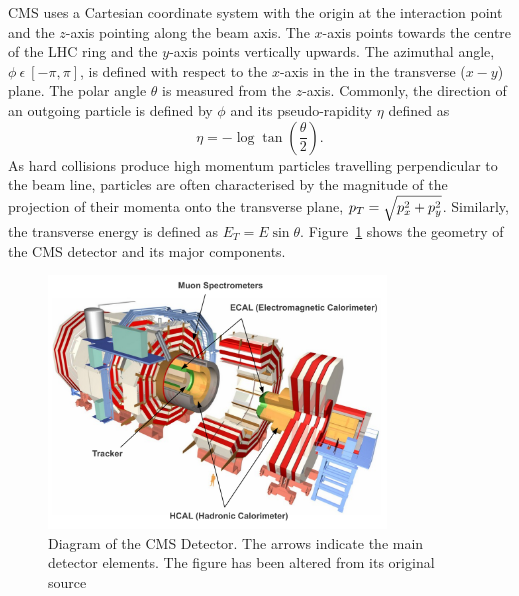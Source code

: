 CMS uses a Cartesian coordinate system with the origin at the 
interaction point and the $z$-axis pointing along the beam axis. The $x$-axis points towards 
the centre of the LHC ring and the $y$-axis points vertically upwards. The azimuthal angle, 
$\phi~\epsilon~[-\pi,\pi]$, is defined with respect to the $x$-axis in the in the 
transverse ($x-y$) plane. The polar angle $\theta$ is measured from the $z$-axis. Commonly,
the direction of an outgoing particle is defined by $\phi$ and its pseudo-rapidity $\eta$ 
defined as 
\begin{equation}
	\eta=-\log \tan \left( \frac{\theta}{2} \right).
\end{equation}
As hard collisions produce high momentum particles travelling perpendicular to the beam line, 
particles are often characterised
by the magnitude of the projection of their momenta onto the transverse plane, 
$p_{T}=\sqrt{p_{x}^{2}+p_{y}^{2}}$.
Similarly, the transverse energy is defined as $E_{T}=E\sin\theta$.
Figure~\ref{fig:cms} shows the geometry of the CMS detector and its major components. 

\begin{figure}
\centering
	\includegraphics[width=0.8\textwidth]{detector/cmsdetector}
	\caption{Diagram of the CMS Detector. The arrows indicate the main detector elements. 
	The figure has been altered from its original source~\cite{cmspub}}
	\label{fig:cms}
\end{figure}

